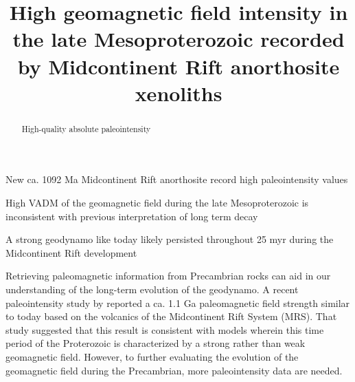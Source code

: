 \documentclass[draft]{agujournal2019}
\begin{document}
\title{High geomagnetic field intensity in the late Mesoproterozoic recorded by Midcontinent Rift anorthosite xenoliths}





\begin{keypoints}
\item New ca. 1092 Ma Midcontinent Rift anorthosite record high paleointensity values
\item High VADM of the geomagnetic field during the late Mesoproterozoic is inconsistent with previous interpretation of long term decay
\item A strong geodynamo like today likely persisted throughout 25 myr during the Midcontinent Rift development
\end{keypoints}





\begin{abstract}
High-quality absolute paleointensity 

\end{abstract}
Retrieving paleomagnetic information from Precambrian rocks can aid in our understanding of the long-term evolution of the geodynamo. A recent paleointensity study by \cite{Sprain2018a} reported a ca. 1.1 Ga paleomagnetic field strength similar to today based on the volcanics of the Midcontinent Rift System (MRS). That study suggested that this result is consistent with models wherein this time period of the Proterozoic is characterized by a strong rather than weak geomagnetic field. However, to further evaluating the evolution of the geomagnetic field during the Precambrian, more paleointensity data are needed. 
\end{document}
